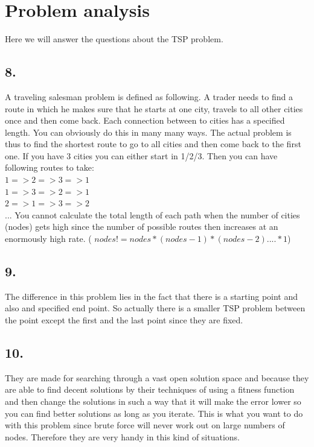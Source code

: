 \documentclass{scrartcl}
\begin{document}
\section*{Problem analysis}
Here we will answer the questions about the TSP problem.

\subsection*{8.}
A traveling salesman problem is defined as following. A trader needs to find a route in which he makes sure that he starts at one city, travels to all other cities once and then come back. Each connection between to cities has a specified length. You can obviously do this in many many ways. The actual problem is thus to find the shortest route to go to all cities and then come back to the first one.
If you have 3 cities you can either start in 1/2/3. Then you can have following routes to take:\\
$1=>2=>3=>1$\\
$1=>3=>2=>1$\\
$2=>1=>3=>2$\\
...
You cannot calculate the total length of each path when the number of cities (nodes) gets high since the number of possible routes then increases at an enormously high rate. ( $nodes! = nodes*(nodes-1)*(nodes-2)....*1$)

\subsection*{9.}
The difference in this problem lies in the fact that there is a starting point and also and specified end point. So actually there is a smaller TSP problem between the point except the first and the last point since they are fixed.

\subsection*{10.}
They are made for searching through a vast open solution space and because they are able to find decent solutions by their techniques of using a fitness function and then change the solutions in such a way that it will make the error lower so you can find better solutions as long as you iterate. This is what you want to do with this problem since brute force will never work out on large numbers of nodes. Therefore they are very handy in this kind of situations.
\end{document}
